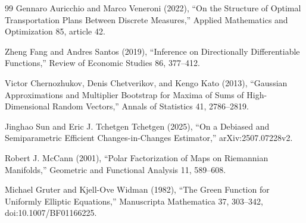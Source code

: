 \documentclass{article}
\begin{document}
\begin{thebibliography}{99}
   Gennaro Auricchio and Marco Veneroni (2022), ``On the Structure of Optimal Transportation Plans Between Discrete Measures,'' Applied Mathematics and Optimization 85, article 42.

   Zheng Fang and Andres Santos (2019), ``Inference on Directionally Differentiable Functions,'' Review of Economic Studies 86, 377--412.

   Victor Chernozhukov, Denis Chetverikov, and Kengo Kato (2013), ``Gaussian Approximations and Multiplier Bootstrap for Maxima of Sums of High-Dimensional Random Vectors,'' Annals of Statistics 41, 2786--2819.

   Jinghao Sun and Eric J. Tchetgen Tchetgen (2025), ``On a Debiased and Semiparametric Efficient Changes-in-Changes Estimator,'' arXiv:2507.07228v2.

   Robert J. McCann (2001), ``Polar Factorization of Maps on Riemannian Manifolds,'' Geometric and Functional Analysis 11, 589--608.

   Michael Gruter and Kjell-Ove Widman (1982), ``The Green Function for Uniformly Elliptic Equations,'' Manuscripta Mathematica 37, 303--342, doi:10.1007/BF01166225.

\end{thebibliography}
\end{document}
